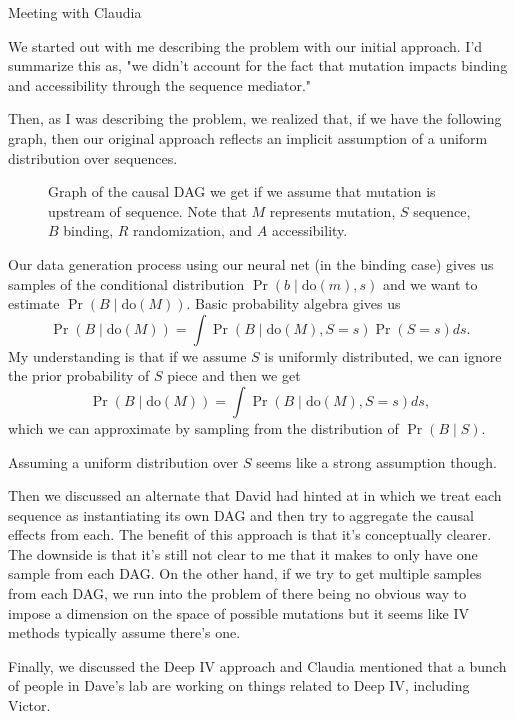 \begin{Minutes}{Meeting with Claudia}
\maketitle
{}
We started out with me describing the problem with our initial approach. I'd summarize this as, "we didn't account for the fact that mutation impacts binding and accessibility through the sequence mediator."

Then, as I was describing the problem, we realized that, if we have the following graph, then our original approach reflects an implicit assumption of a uniform distribution over sequences.
\begin{figure}[ht]
  \begin{center}
      
  \end{center}
  \caption{Graph of the causal DAG we get if we assume that mutation is upstream of sequence. Note that $ M $ represents mutation, $ S $ sequence, $ B $ binding, $ R $ randomization, and $ A $ accessibility.}
\end{figure}

Our data generation process using our neural net (in the binding case) gives us samples of the conditional distribution \( \Pr(b \mid \text{do}(m), s) \) and we want to estimate \( \Pr(B \mid \text{do}(M)) \). Basic probability algebra gives us
\[ \Pr(B \mid \text{do}(M)) = \int \Pr(B \mid \text{do}(M), S = s) \Pr(S = s) ds. \]
My understanding is that if we assume $ S $ is uniformly distributed, we can ignore the prior probability of $ S $ piece and then we get
\[ \Pr(B \mid \text{do}(M)) = \int \Pr(B \mid \text{do}(M), S=s) ds, \]
which we can approximate by sampling from the distribution of $ \Pr(B \mid S) $.

Assuming a uniform distribution over $ S $ seems like a strong assumption though.

Then we discussed an alternate that David had hinted at in which we treat each sequence as instantiating its own DAG and then try to aggregate the causal effects from each. The benefit of this approach is that it's conceptually clearer. The downside is that it's still not clear to me that it makes to only have one sample from each DAG. On the other hand, if we try to get multiple samples from each DAG, we run into the problem of there being no obvious way to impose a dimension on the space of possible mutations but it seems like IV methods typically assume there's one.

Finally, we discussed the Deep IV approach and Claudia mentioned that a bunch of people in Dave's lab are working on things related to Deep IV, including Victor.


\end{Minutes}

